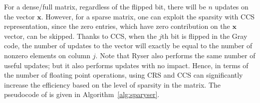 \documentclass{elektr}
\newcommand{\algrule}[1][.2pt]{\par\vskip.5\baselineskip\hrule height #1\par\vskip.5\baselineskip}
\newcommand{\Ab}{\mathbf{A}}
\newcommand{\xb}{\mathbf{x}}
\begin{document}


For a dense/full matrix, regardless of the flipped bit, there will be $n$ updates on the vector $\xb$. However, for a sparse matrix, one can exploit the sparsity with CCS representation, since the zero entries, which have zero contribution on the $\xb$ vector, can be skipped. Thanks to CCS, when the $j$th bit is flipped in the Gray code, the number of updates to the vector will exactly be equal to the number of nonzero elements on column $j$. 
Note that {\sc Ryser} also performs the same number of useful updates; but it also performs updates with no impact. 
Hence, in terms of the number of floating point operations, using CRS and CCS can significantly increase the efficiency based on the level of sparsity in the matrix. The pseudocode of {} is given in Algorithm~\ref{alg:sparyser}.
\end{document}
